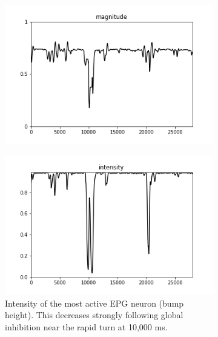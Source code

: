 \documentclass{article}
\begin{document}


\begin{figure}[h]
	\centering
	\begin{subfigure}[t]{0.47\linewidth}
		\centering
		\includegraphics[width = 1.0\linewidth, trim={40 20 40 20}, clip=true]{../figures/sim_mag.png}
		\label{fig:mag}	
	\end{subfigure}
	\hspace{0.04\linewidth}
	\begin{subfigure}[t]{0.47\linewidth}
		\centering
		\includegraphics[width = 1.0\linewidth, trim={40 20 40 20}, clip=true]{../figures/sim_int.png}
		\caption{Intensity of the most active EPG neuron (bump height). This decreases strongly following global inhibition near the rapid turn at 10,000 ms.}
		\label{fig:int}
	\end{subfigure}
\caption{}
\label{fig:quench}
\end{figure}
\end{document}
